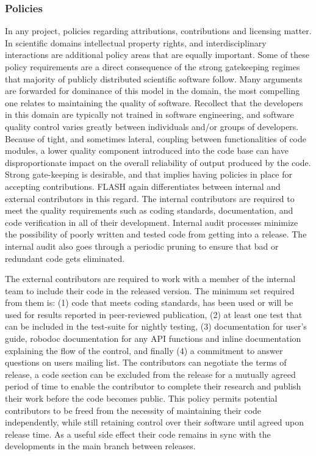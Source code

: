\subsubsection{Policies}
\label{sec:FLASHPolicies}
In any project, policies regarding attributions, contributions and
licensing matter. In scientific domains intellectual property rights,
and interdisciplinary interactions are additional policy
areas that are equally important. Some of these policy requirements
are a direct consequence of the strong gatekeeping regimes that
majority of publicly distributed scientific software follow.  Many arguments
are forwarded for dominance of this model in the domain, the
most compelling one relates to maintaining the quality of
software. Recollect that the developers in this domain are typically
not trained in software engineering, and software quality control
varies greatly between individuals and/or groups of
developers. Because of tight, and sometimes lateral, coupling between
functionalities of code modules, a lower quality component introduced
into the code base can have disproportionate impact on the overall
reliability of output produced by the code. Strong gate-keeping is
desirable, and that implies having policies in place for accepting
contributions. FLASH again differentiates between internal and
external contributors in this regard. The internal contributors are
required to meet the quality requirements such as coding standards,
documentation, and code verification in all of their
development. Internal audit processes minimize the possibility of
poorly written and tested code from getting into a release. The internal audit also goes
through a periodic pruning to ensure that bad or redundant code gets
eliminated.  

The external contributors are required to work with a member of the
internal team to include their code in the released version. The
minimum set required from them is:  (1) code that meets coding standards,
has been used or will be used for results reported in peer-reviewed
publication, (2) at least one test that can be included in the
test-suite for nightly testing, (3) documentation for user's guide,
robodoc documentation for any API functions and inline documentation
explaining the flow of the control, and finally (4) a commitment to answer
questions on users mailing list. The contributors can negotiate the
terms of release, a code section can be excluded from the release for
a mutually agreed period of time to enable the contributor to complete
their research and publish their work before the code becomes
public. This policy permits potential contributors to be freed
from the necessity of maintaining their code independently, while
still retaining control over their software until agreed upon
release time.  As a useful side effect their code remains in sync with
the developments in the main branch between releases.  

